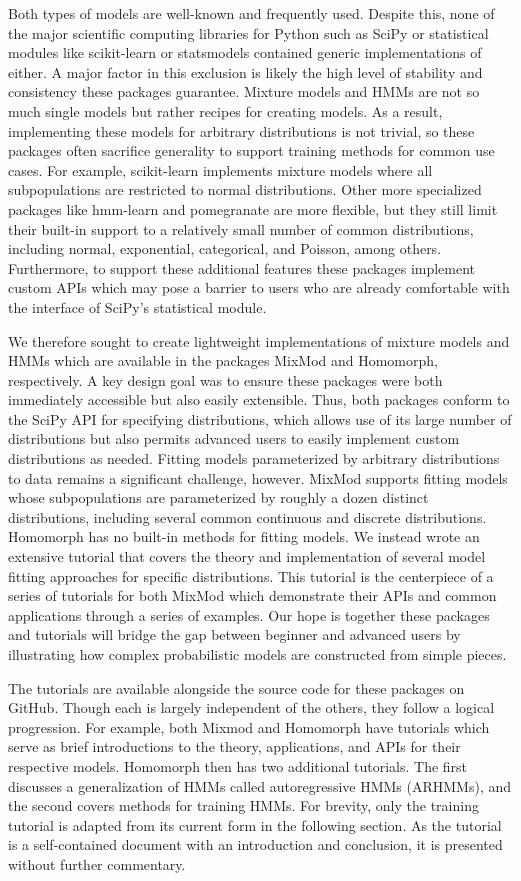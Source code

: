 Both types of models are well-known and frequently used. Despite this, none of the major scientific computing libraries for Python such as SciPy or statistical modules like scikit-learn or statsmodels contained generic implementations of either. A major factor in this exclusion is likely the high level of stability and consistency these packages guarantee. Mixture models and HMMs are not so much single models but rather recipes for creating models. As a result, implementing these models for arbitrary distributions is not trivial, so these packages often sacrifice generality to support training methods for common use cases. For example, scikit-learn implements mixture models where all subpopulations are restricted to normal distributions. Other more specialized packages like hmm-learn and pomegranate are more flexible, but they still limit their built-in support to a relatively small number of common distributions, including normal, exponential, categorical, and Poisson, among others. Furthermore, to support these additional features these packages implement custom APIs which may pose a barrier to users who are already comfortable with the interface of SciPy's statistical module.

We therefore sought to create lightweight implementations of mixture models and HMMs which are available in the packages MixMod and Homomorph, respectively. A key design goal was to ensure these packages were both immediately accessible but also easily extensible. Thus, both packages conform to the SciPy API for specifying distributions, which allows use of its large number of distributions but also permits advanced users to easily implement custom distributions as needed. Fitting models parameterized by arbitrary distributions to data remains a significant challenge, however. MixMod supports fitting models whose subpopulations are parameterized by roughly a dozen distinct distributions, including several common continuous and discrete distributions. Homomorph has no built-in methods for fitting models. We instead wrote an extensive tutorial that covers the theory and implementation of several model fitting approaches for specific distributions. This tutorial is the centerpiece of a series of tutorials for both MixMod which demonstrate their APIs and common applications through a series of examples. Our hope is together these packages and tutorials will bridge the gap between beginner and advanced users by illustrating how complex probabilistic models are constructed from simple pieces.

The tutorials are available alongside the source code for these packages on GitHub. Though each is largely independent of the others, they follow a logical progression. For example, both Mixmod and Homomorph have tutorials which serve as brief introductions to the theory, applications, and APIs for their respective models. Homomorph then has two additional tutorials. The first discusses a generalization of HMMs called autoregressive HMMs (ARHMMs), and the second covers methods for training HMMs. For brevity, only the training tutorial is adapted from its current form in the following section. As the tutorial is a self-contained document with an introduction and conclusion, it is presented without further commentary.
